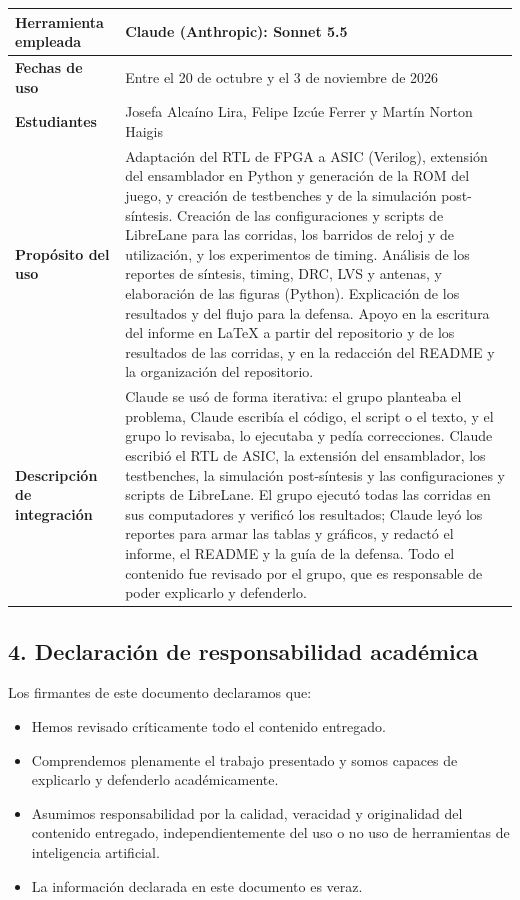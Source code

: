\documentclass[11pt,letterpaper]{article}
\begin{document}
\begin{table}[H]
\centering
\begin{tabularx}{\linewidth}{|l|X|}
\hline
\textbf{Herramienta empleada} & Claude (Anthropic): Sonnet 5.5 \\
\hline
\textbf{Fechas de uso} & Entre el 20 de octubre y el 3 de noviembre de 2026 \\
\hline
\textbf{Estudiantes} & Josefa Alcaíno Lira, Felipe Izcúe Ferrer y Martín Norton Haigis \\
\hline
\textbf{Propósito del uso} & Adaptación del RTL de FPGA a ASIC (Verilog), extensión del ensamblador en Python y generación de la ROM del juego, y creación de testbenches y de la simulación post-síntesis. Creación de las configuraciones y scripts de LibreLane para las corridas, los barridos de reloj y de utilización, y los experimentos de timing. Análisis de los reportes de síntesis, timing, DRC, LVS y antenas, y elaboración de las figuras (Python). Explicación de los resultados y del flujo para la defensa. Apoyo en la escritura del informe en LaTeX a partir del repositorio y de los resultados de las corridas, y en la redacción del README y la organización del repositorio. \\
\hline
\textbf{Descripción de integración} & Claude se usó de forma iterativa: el grupo planteaba el problema, Claude escribía el código, el script o el texto, y el grupo lo revisaba, lo ejecutaba y pedía correcciones. Claude escribió el RTL de ASIC, la extensión del ensamblador, los testbenches, la simulación post-síntesis y las configuraciones y scripts de LibreLane. El grupo ejecutó todas las corridas en sus computadores y verificó los resultados; Claude leyó los reportes para armar las tablas y gráficos, y redactó el informe, el README y la guía de la defensa. Todo el contenido fue revisado por el grupo, que es responsable de poder explicarlo y defenderlo. \\
\hline
\end{tabularx}
\end{table}

\newpage
\subsection*{4. Declaración de responsabilidad académica} \noindent Los firmantes de este documento declaramos que:
\begin{itemize}
  \item Hemos revisado críticamente todo el contenido entregado.
  \item Comprendemos plenamente el trabajo presentado y somos capaces de explicarlo y defenderlo académicamente.
  \item Asumimos responsabilidad por la calidad, veracidad y originalidad del contenido entregado, independientemente del uso o no uso de herramientas de inteligencia artificial.
  \item La información declarada en este documento es veraz.
\end{itemize}
\end{document}
